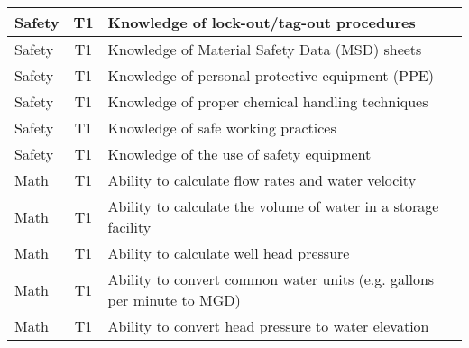 \documentclass{article}
\begin{document}
\begin{table}[]
\begin{tabular}{|l|c|l|}
Safety                                 & T1             & Knowledge of   lock-out/tag-out procedures                                                                                        \\ \hline
Safety                                 & T1             & Knowledge of Material   Safety Data (MSD) sheets                                                                                  \\ \hline
Safety                                 & T1             & Knowledge of personal   protective equipment (PPE)                                                                                \\ \hline
Safety                                 & T1             & Knowledge of proper   chemical handling techniques                                                                                \\ \hline
Safety                                 & T1             & Knowledge of safe   working practices                                                                                             \\ \hline
Safety                                 & T1             & Knowledge of the use   of safety equipment                                                                                        \\ \hline
Math                                   & T1             & Ability to calculate   flow rates and water velocity                                                                              \\ \hline
Math                                   & T1             & Ability to calculate   the volume of water in a storage facility                                                                  \\ \hline
Math                                   & T1             & Ability to calculate   well head pressure                                                                                         \\ \hline
Math                                   & T1             & Ability to convert   common water units (e.g. gallons per minute to MGD)                                                          \\ \hline
Math                                   & T1             & Ability to convert   head pressure to water elevation                                                                             \\ \hline

\end{tabular}
\end{table}
\end{document}
